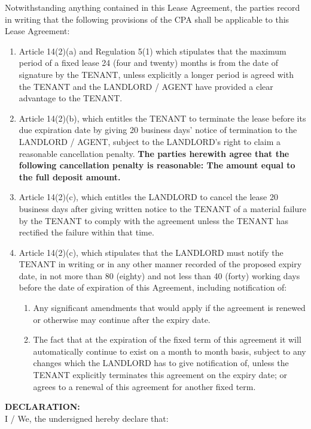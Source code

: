 \documentclass[11pt]{article}
\begin{document}
Notwithstanding anything contained in this Lease Agreement, the parties record in writing that the following provisions of the CPA shall be applicable to this Lease Agreement:
\begin{enumerate}
	\item Article 14(2)(a) and Regulation 5(1) which stipulates that the maximum period of a fixed lease 24 (four and twenty) months is from the date of signature by the TENANT, unless explicitly a longer period is agreed with the TENANT and the LANDLORD / AGENT have provided a clear advantage to the TENANT.
	\item Article 14(2)(b), which entitles the TENANT to terminate the lease before its due expiration date by giving 20 business days' notice of termination to the LANDLORD / AGENT, subject to the LANDLORD's right to claim a reasonable cancellation penalty. \textbf{The parties herewith agree that the following cancellation penalty is reasonable: The amount equal to the full deposit amount.}
	\item Article 14(2)(c), which entitles the LANDLORD to cancel the lease 20 business days after giving written notice to the TENANT of a material failure by the TENANT to comply with the agreement unless the TENANT has rectified the failure within that time.
	\item Article 14(2)(c), which stipulates that the LANDLORD must notify the TENANT in writing or in any other manner recorded of the proposed expiry date, in not more than 80 (eighty) and not less than 40 (forty) working days before the date of expiration of this Agreement, including notification of:

		\begin{enumerate}
			\item Any significant amendments that would apply if the agreement is renewed or otherwise may continue after the expiry date.
			\item The fact that at the expiration of the fixed term of this agreement it will automatically continue to exist on a month to month basis, subject to any changes which the LANDLORD has to give notification of, unless the TENANT explicitly terminates this agreement on the expiry date; or agrees to a renewal of this agreement for another fixed term.
		\end{enumerate}
\end{enumerate}

\textbf{\uppercase{declaration:}} \\
I / We, the undersigned hereby declare that: \\
\end{document}
